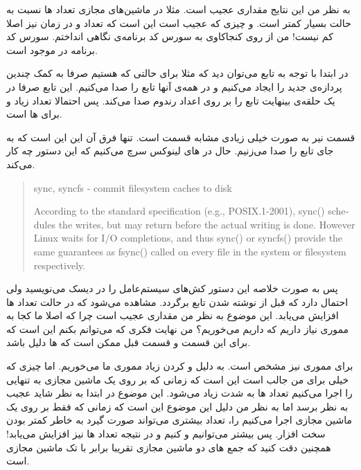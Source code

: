 به نظر من این نتایج مقداری عجیب است. مثلا در ماشین‌های مجازی تعداد
ها
نسبت به حالت
بسیار کمتر است. و چیزی که عجیب است این است که تعداد
 و 
در زمان
نیز اصلا کم نیست! من از روی کنجاکاوی به سورس کد برنامه‌ی
نگاهی انداختم. سورس کد برنامه در
موجود است.

در ابتدا با توجه به تابع
می‌توان دید که مثلا برای حالتی که
هستیم صرفا به کمک
چندین پردازه‌ی جدید را ایجاد می‌کنیم و در همه‌ی آنها تابع
را صدا می‌کنیم. این تابع صرفا در یک حلقه‌ی بینهایت تابع
را بر روی اعداد رندوم صدا می‌کند.
پس احتمالا تعداد زیاد
 و 
برای
ها
است.

قسمت
نیر به صورت خیلی زیادی مشابه قسمت
است. تنها فرق آن این این است که به جای
تابع
را صدا می‌زنیم. حال در
های
لینوکس سرچ می‌کنیم که این دستور چه کار می‌کند.
\begin{latin}
    \begin{quote}
        sync, syncfs - commit filesystem caches to disk

        According to the standard specification  (e.g.,  POSIX.1-2001),  sync()
       schedules the writes, but may return before the actual writing is done.
       However Linux waits for I/O completions, and thus  sync()  or  syncfs()
       provide the same guarantees as fsync() called on every file in the system or filesystem respectively.
    \end{quote}
\end{latin}
پس به صورت خلاصه این دستور کش‌های سیستم‌عامل را در دیسک می‌نویسید ولی احتمال دارد که قبل از نوشته شدن تابع برگردد.
مشاهده می‌شود که در حالت
تعداد
ها
افزایش می‌یابد. این موضوع به نظر من مقداری عجیب است چرا که اصلا ما کجا به مموری نیاز داریم که داریم
می‌خوریم؟ من نهایت فکری که می‌توانم بکنم این است که برای این قسمت و قسمت قبل ممکن است که
ها
دلیل
باشد.

برای مموری نیز مشخص است. به دلیل 
و
کردن زیاد مموری ما
می‌خوریم. اما چیزی که خیلی برای من جالب است این است که زمانی که بر روی یک ماشین مجازی به تنهایی 
را اجرا می‌کنیم تعداد
ها
به شدت زیاد می‌شود. این موضوع در ابتدا به نظر شاید عجیب به نظر برسد اما به نظر من دلیل این موضوع این است
که زمانی که فقط بر روی یک ماشین مجازی اجرا می‌کنیم
 را،
تعداد
بیشتری می‌تواند صورت گیرد به خاطر کمتر
بودن سخت افزار. پس بیشتر می‌‌توانیم
 و 
کنیم و در نتیجه تعداد
ها
نیز افزایش می‌یابد! همچنین دقت کنید که جمع
های
دو ماشین مجازی تقریبا برابر با تک ماشین مجازی است.

